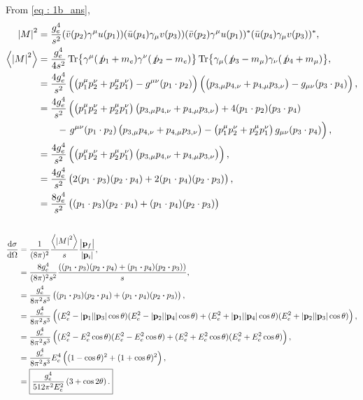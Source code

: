 \documentclass[
a4paper,
10pt,
twoside,
prd,
aps,
nofootinbib,
superscriptaddress,
floatfix,
preprintnumbers,
]{article}
\begin{document}
From \ref{eq : 1b_ans},
\begin{align}
    \abs{M}^2&= \frac{g_e^4}{s^2} (\bar{v}(p_2)\gamma^\mu u(p_1))(\bar{u}(p_4)\gamma_\mu v(p_3)) (\bar{v}(p_2)\gamma^\mu u(p_1))^*(\bar{u}(p_4)\gamma_\mu v(p_3))^*,\\
    \ev{\abs{M}^2} &= \frac{g_e^4}{4s^2} \Tr{\gamma^\mu (\not p_1+m_e)\gamma^\nu (\not p_2-m_e)} \Tr{\gamma_\mu(\not p_3 - m_\mu)\gamma_\nu(\not p_4 + m_\mu)},\\
    &= \frac{4g_e^4}{s^2} \left(\left(p_1^\mu p_2^\nu + p_2^\mu p_1^\nu\right) -g^{\mu\nu} (p_1\cdot p_2) \right) \left(\left(p_{3,\mu} p_{4,\nu} + p_{4,\mu} p_{3,\nu}\right) -g_{\mu\nu} (p_3\cdot p_4)\right),\\
    &=  \frac{4g_e^4}{s^2} \left(\left(p_1^\mu p_2^\nu + p_2^\mu p_1^\nu\right)\left(p_{3,\mu} p_{4,\nu} + p_{4,\mu} p_{3,\nu}\right) + 4 (p_1\cdot p_2)(p_3\cdot p_4)\right.\nonumber\\
    &\qquad - \left. g^{\mu\nu} (p_1\cdot p_2)\left(p_{3,\mu} p_{4,\nu} + p_{4,\mu} p_{3,\nu}\right) - \left(p_1^\mu p_2^\nu + p_2^\mu p_1^\nu\right)g_{\mu\nu} (p_3\cdot p_4) \right),\\
    &= \frac{4g_e^4}{s^2} \left(\left(p_1^\mu p_2^\nu + p_2^\mu p_1^\nu\right)\left(p_{3,\mu} p_{4,\nu} + p_{4,\mu} p_{3,\nu}\right) \right),\\
    &= \frac{4g_e^4}{s^2} \left(2(p_1\cdot p_3)(p_2\cdot p_4) + 2(p_1 \cdot p_4)(p_2 \cdot p_3) \right),\\
    &= \frac{8g_e^4}{s^2} \left((p_1\cdot p_3)(p_2\cdot p_4) + (p_1 \cdot p_4)(p_2 \cdot p_3) \right)
\end{align}

\subsection{}

\begin{align}
    \dv{\sigma}{\Omega} &= \frac{1}{(8\pi)^2} \frac{\ev{\abs{M}^2}}{s}\frac{\abs{\vb{p}_f}}{\abs{\vb{p}_i}},\\
    &= \frac{8g_e^4}{(8\pi)^2 s^2} \frac{((p_1\vdot p_3)(p_2\vdot p_4) + (p_1\vdot p_4)(p_2\vdot p_3))}{s},\\
    &= \frac{g_e^4}{8\pi^2 s^3}\left((p_1\vdot p_3)(p_2\vdot p_4) + (p_1\vdot p_4)(p_2\vdot p_3)\right),\\
    &= \frac{g_e^4}{8\pi^2 s^3} \left((E_e^2 - \abs{\vb{p}_1}\abs{\vb{p}_3}\cos\theta)(E_e^2 - \abs{\vb{p}_2}\abs{\vb{p}_4}\cos\theta) + (E_e^2 + \abs{\vb{p}_1}\abs{\vb{p}_4}\cos\theta)(E_e^2 + \abs{\vb{p}_2}\abs{\vb{p}_3}\cos\theta)\right),\\
    &= \frac{g_e^4}{8\pi^2 s^3} \left((E_e^2 - E_e^2\cos\theta)(E_e^2 - E_e^2\cos\theta) + (E_e^2 + E_e^2\cos\theta)(E_e^2 + E_e^2\cos\theta)\right),\\
    &= \frac{g_e^4}{8\pi^2 s^3} E_e^4\left((1 - \cos\theta)^2+(1 + \cos\theta)^2\right),\\
    &= \boxed{\frac{g_e^4}{512\pi^2 E_e^2} \left(3+\cos2\theta\right).}
\end{align}
\end{document}
